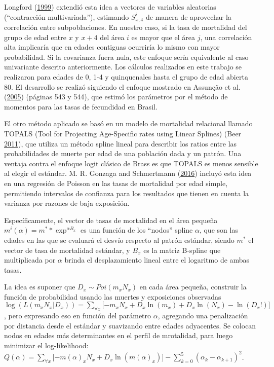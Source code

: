 \documentclass[12pt,]{article}
\begin{document}
Longford (\protect\hyperlink{ref-Longford1999}{1999}) extendió esta idea
a vectores de variables aleatorias (``contracción multivariada''),
estimando \(S_{x,4}^{i}\) de manera de aprovechar la correlación entre
subpoblaciones. En nuestro caso, si la tasa de mortalidad del grupo de
edad entre \(x\) y \(x+4\) del área \(i\) es mayor que el área \(j\),
una correlación alta implicaría que en edades contiguas ocurriría lo
mismo con mayor probabilidad. Si la covarianza fuera nula, este enfoque
sería equivalente al caso univariante descrito anteriormente. Los
cálculos realizados en este trabajo se realizaron para edades de 0, 1-4
y quinquenales hasta el grupo de edad abierta 80. El desarrollo se
realizó siguiendo el enfoque mostrado en Assunção et al.
(\protect\hyperlink{ref-Assuncao2005}{2005}) (páginas 543 y 544), que
estimó los parámetros por el método de momentos para las tasas de
fecundidad en Brasil.

El otro método aplicado se basó en un modelo de mortalidad relacional
llamado TOPALS (Tool for Projecting Age-Specific rates using Linear
Splines) (Beer \protect\hyperlink{ref-deBeer2011}{2011}), que utiliza un
método spline lineal para describir los ratios entre las probabilidades
de muerte por edad de una población dada y un patrón. Una ventaja contra
el enfoque logit clásico de Brass es que TOPALS es menos sensible al
elegir el estándar. M. R. Gonzaga and Schmertmann
(\protect\hyperlink{ref-Gonzaga_Schmertmann_2016}{2016}) incluyó esta
idea en una regresión de Poisson en las tasas de mortalidad por edad
simple, permitiendo intervalos de confianza para los resultados que
tienen en cuenta la varianza por razones de baja exposición.

Específicamente, el vector de tasas de mortalidad en el área pequeña
\(m^{i}(\alpha) = m^{*}*\exp^{\alpha B_{x}}\) es una función de los
``nodos'' spline \(\alpha\), que son las edades en las que se evaluará
el desvío respecto al patrón estándar, siendo \(m^*\) el vector de tasa
de mortalidad estándar, y \(B_{x}\) es la matriz B-spline que
multiplicada por \(\alpha\) brinda el desplazamiento lineal entre el
logaritmo de ambas tasas.

La idea es suponer que \(D_{x}\sim Poi (m_ {x} N_ {x})\) en cada área
pequeña, construir la función de probabilidad usando las muertes y
exposiciones observadas
\(\log(L(m_{x}N_{x}|D_{x}))=\sum_{\forall x}{\lbrack -m_{x}N_{x}+D_{x}\ln (m_{x})+D_{x}\ln (N_{x})-\ln (D_{x}!)\rbrack}\),
pero expresando eso en función del parámetro \(\alpha\), agregando una
penalización por distancia desde el estándar y suavizando entre edades
adyacentes. Se colocan nodos en edades más determinantes en el perfil de
mrotalidad, para luego minimizar el log-likelihood:
\(Q(\alpha )=\sum_{\forall x}{\lbrack -m(\alpha )_{x}N_{x}+D_{x}\ln(m(\alpha )_{x})\rbrack }-\sum_{k=0}^{5}{(\alpha _{k}-\alpha _{k+1})^{2}}\).
\end{document}
